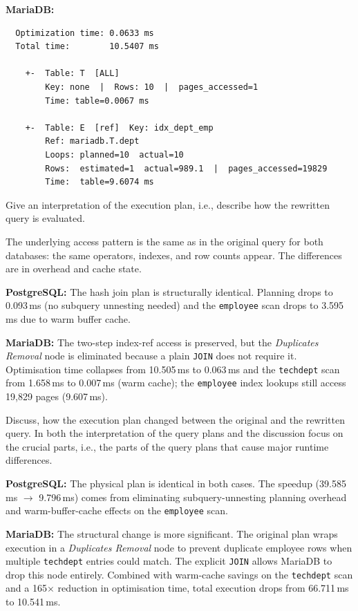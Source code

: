 \documentclass[11pt]{scrartcl}
\begin{document}
\textbf{MariaDB:}

{\small
\parskip0pt\begin{verbatim}
  Optimization time: 0.0633 ms
  Total time:        10.5407 ms

    +-  Table: T  [ALL]
        Key: none  |  Rows: 10  |  pages_accessed=1
        Time: table=0.0067 ms

    +-  Table: E  [ref]  Key: idx_dept_emp
        Ref: mariadb.T.dept
        Loops: planned=10  actual=10
        Rows:  estimated=1  actual=989.1  |  pages_accessed=19829
        Time:  table=9.6074 ms
\end{verbatim}}

Give an interpretation of the execution plan, i.e., describe how the rewritten query is evaluated.

The underlying access pattern is the same as in the original query for both databases: the same operators, indexes, and row counts appear. The differences are in overhead and cache state.

\textbf{PostgreSQL:} The hash join plan is structurally identical. Planning drops to 0.093\,ms (no subquery unnesting needed) and the \texttt{employee} scan drops to 3.595\,ms due to warm buffer cache.

\textbf{MariaDB:} The two-step index-ref access is preserved, but the \textit{Duplicates Removal} node is eliminated because a plain \texttt{JOIN} does not require it. Optimisation time collapses from 10.505\,ms to 0.063\,ms and the \texttt{techdept} scan from 1.658\,ms to 0.007\,ms (warm cache); the \texttt{employee} index lookups still access 19,829 pages (9.607\,ms).

Discuss, how the execution plan changed between the original and the rewritten query. In both the interpretation of the query plans and the discussion focus on the crucial parts, i.e., the parts of the query plans that cause major runtime differences.

\textbf{PostgreSQL:} The physical plan is identical in both cases. The speedup (39.585\,ms $\to$ 9.796\,ms) comes from eliminating subquery-unnesting planning overhead and warm-buffer-cache effects on the \texttt{employee} scan.

\textbf{MariaDB:} The structural change is more significant. The original plan wraps execution in a \textit{Duplicates Removal} node to prevent duplicate employee rows when multiple \texttt{techdept} entries could match. The explicit \texttt{JOIN} allows MariaDB to drop this node entirely. Combined with warm-cache savings on the \texttt{techdept} scan and a 165$\times$ reduction in optimisation time, total execution drops from 66.711\,ms to 10.541\,ms.
\end{document}
